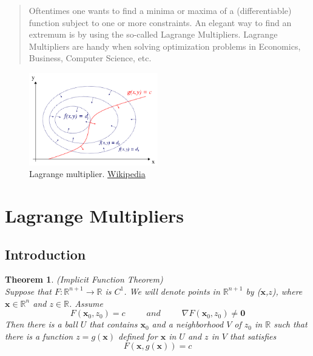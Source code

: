 \documentclass[]{article}
\newtheorem{theorem}{Theorem}
\begin{document}
 
\maketitle
\begin{abstract}
    Oftentimes one wants to find a minima or maxima of a (differentiable) function subject to one or more constraints. An elegant way to find an extremum is by using the so-called Lagrange Multipliers. Lagrange Multipliers are handy when solving optimization problems in Economics, Business, Computer Science, etc. 
\end{abstract}
\begin{figure}[h]
    \centering
    \includegraphics[width=0.50\textwidth]{abstract_img.png}
    \caption{Lagrange multiplier. \href{https://en.wikipedia.org/wiki/Lagrange_multiplier}{Wikipedia}}
\end{figure}


\newpage
\tableofcontents
\newpage

\section{Lagrange Multipliers}
\subsection{Introduction}

\begin{theorem}(Implicit Function Theorem) \\
    Suppose that $F:\mathbb{R}^{n+1}\to \mathbb{R}$ is $C^{1}$. We will denote points in $\mathbb{R}^{n+1}$ 
    by ($\pmb{x}$,$z$), where $\pmb{x}\in \mathbb{R}^n$ and $z\in \mathbb{R}$. Assume \\
    $$
        F(\pmb{x}_{0},z_{0})=c \hspace{30pt} and \hspace{30pt} \nabla F(\pmb{x}_{0},z_{0})\neq \pmb{0}
    $$
    Then there is a ball $U$ that contains $\pmb{x}_{0}$ and a neighborhood $V$ of $z_{0}$ in $\mathbb{R}$ such that there is a function $z=g(\pmb{x})$ defined for $\pmb{x}$ in $U$ and $z$ in $V$ that satisfies
    $$
        F(\pmb{x},g(\pmb{x}))=c
    $$
    
\end{theorem}
\end{document}
